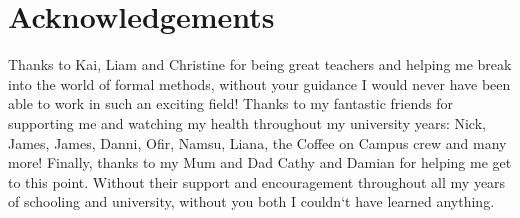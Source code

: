 \chapter*{Acknowledgements}\label{ack}

Thanks to Kai, Liam and Christine for being great teachers and helping me break into the world
of formal methods, without your guidance I would never have been able to work in such an
exciting field!
Thanks to my fantastic friends for supporting me and watching my health throughout my
university years: Nick, James, James, Danni, Ofir, Namsu, Liana, the Coffee on Campus crew and many more!
Finally, thanks to my Mum and Dad Cathy and Damian for helping me get to this point. Without their
support and encouragement throughout all my years of schooling and university, without you both I couldn`t
have learned anything.